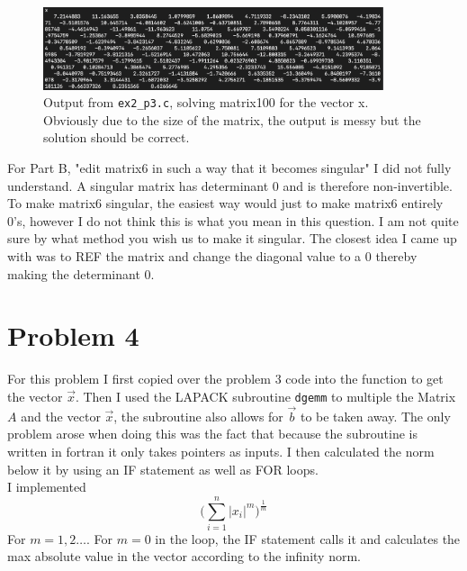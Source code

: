 \documentclass[12pt]{article}
\begin{document}
\begin{figure}
    
    \includegraphics[width=10cm]{matrix100.png}
    \centering
    \caption{Output from \lstinline{ex2_p3.c}, solving matrix100 for the vector x. Obviously due to the size of the matrix, the output is messy but the solution should be correct. }

\end{figure}

For Part B, "edit matrix6 in such a way that it becomes singular" I did not fully understand. A singular matrix has determinant 0 and is therefore non-invertible. To make matrix6 singular, the easiest way would just to make matrix6 entirely 0's, however I do not think this is what you mean in this question.
I am not quite sure by what method you wish us to make it singular. The closest idea I came up with was to REF the matrix and change the diagonal value to a 0 thereby making the determinant 0. 


\section*{Problem 4} 
For this problem I first copied over the problem 3 code into the function to get the vector $\vec{x}$. Then I used the LAPACK subroutine \lstinline{dgemm} to multiple the Matrix $A$ and the vector $\vec{x}$, the subroutine also allows for $\vec{b}$ to be taken away. 
The only problem arose when doing this was the fact that because the subroutine is written in fortran it only takes pointers as inputs. 
I then calculated the norm below it by using an IF statement as well as FOR loops. 
\\
I implemented 
$$ \Big( \sum_{i=1}^n |x_i|^m \Big)^{\frac{1}{m}} $$
For $m=1,2 \ldots$. For $m = 0$ in the loop, the IF statement calls it and calculates the max absolute value in the vector according to the infinity norm. 
\end{document}
